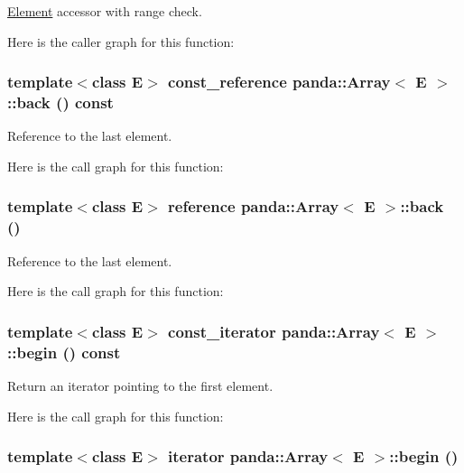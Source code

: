 \hyperlink{classpanda_1_1Element}{Element} accessor with range check. 

Here is the caller graph for this function:\hypertarget{classpanda_1_1Array_ab0134351628f5472db5984f5bc3531c3}{
\subsubsection[{back}]{\setlength{\rightskip}{0pt plus 5cm}template$<$class E$>$ {\bf const\_\-reference} {\bf panda::Array}$<$ E $>$::back () const}}
\label{classpanda_1_1Array_ab0134351628f5472db5984f5bc3531c3}


Reference to the last element. 

Here is the call graph for this function:\hypertarget{classpanda_1_1Array_a4f8973eed439312b468841ebb1a71717}{
\subsubsection[{back}]{\setlength{\rightskip}{0pt plus 5cm}template$<$class E$>$ {\bf reference} {\bf panda::Array}$<$ E $>$::back ()}}
\label{classpanda_1_1Array_a4f8973eed439312b468841ebb1a71717}


Reference to the last element. 

Here is the call graph for this function:\hypertarget{classpanda_1_1Array_a38f03e433d2f19fa1074226fc24a6cdf}{
\subsubsection[{begin}]{\setlength{\rightskip}{0pt plus 5cm}template$<$class E$>$ {\bf const\_\-iterator} {\bf panda::Array}$<$ E $>$::begin () const}}
\label{classpanda_1_1Array_a38f03e433d2f19fa1074226fc24a6cdf}


Return an iterator pointing to the first element. 

Here is the call graph for this function:\hypertarget{classpanda_1_1Array_a8fa2cf8c33bb87c6c398e44e901ad9b9}{
\subsubsection[{begin}]{\setlength{\rightskip}{0pt plus 5cm}template$<$class E$>$ {\bf iterator} {\bf panda::Array}$<$ E $>$::begin ()}}
\label{classpanda_1_1Array_a8fa2cf8c33bb87c6c398e44e901ad9b9}


